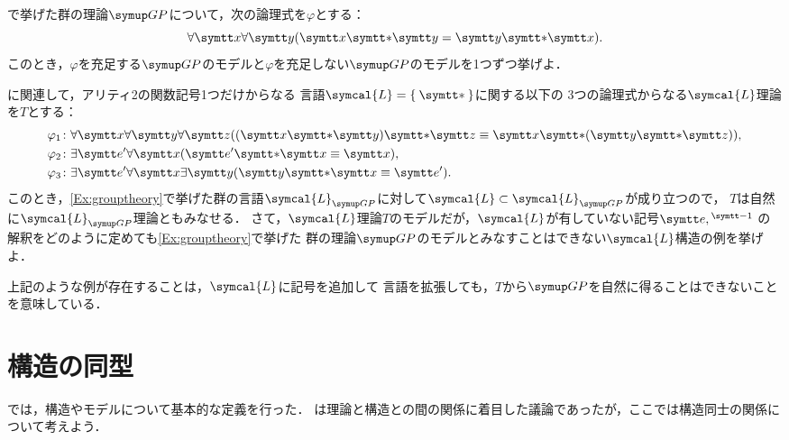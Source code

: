 \begin{Que} \label{Que:model}
	で挙げた群の理論\(\GP\)について，次の論理式を\(\varphi\)とする：
	\[
		\forall \obj{x} \forall \obj{y} \paren{\obj{x} \obj{\ast} \obj{y} = \obj{y} \obj{\ast} \obj{x}}.
	\]
	このとき，\(\varphi\)を充足する\(\GP\)のモデルと\(\varphi\)を充足しない\(\GP\)のモデルを1つずつ挙げよ．
\end{Que}

\begin{Que} \label{Que:grouptheoryaxiomize}
	に関連して，アリティ2の関数記号1つだけからなる
	言語\(\symcal{L} = \Set{\obj{\ast}}\)に関する以下の
	3つの論理式からなる\(\symcal{L}\)理論を\(T\)とする：
	\begin{align*}
		\varphi_1 \colon & \forall \obj{x} \forall \obj{y} \forall \obj{z}
		\paren{\paren{\obj{x} \obj{\ast} \obj{y}} \obj{\ast} \obj{z} \objeq \obj{x} \obj{\ast} \paren{\obj{y} \obj{\ast} \obj{z}}}, \\
		\varphi_2 \colon & \exists \obj{e'} \forall \obj{x} \paren{\obj{e'} \obj{\ast} \obj{x} \objeq \obj{x}},                     \\
		\varphi_3 \colon & \exists \obj{e'}\forall \obj{x} \exists \obj{y} \paren{\obj{y} \obj{\ast} \obj{x} \objeq \obj{e'}}.
	\end{align*}
	このとき，\cref{Ex:grouptheory}で挙げた群の言語\(\symcal{L}_{\GP}\)に対して\(\symcal{L} \subset \symcal{L}_{\GP}\)が成り立つので，
	\(T\)は自然に\(\symcal{L}_{\GP}\)理論ともみなせる．
	さて，\(\symcal{L}\)理論\(T\)のモデルだが，\(\symcal{L}\)が有していない記号\(\obj{e}, {}^{\obj{-1}}\)
	の解釈をどのように定めても\cref{Ex:grouptheory}で挙げた
	群の理論\(\GP\)のモデルとみなすことはできない\(\symcal{L}\)構造の例を挙げよ．

	上記のような例が存在することは，\(\symcal{L}\)に記号を追加して
	言語を拡張しても，\(T\)から\(\GP\)を自然に得ることはできないことを意味している．
\end{Que}



\section{構造の同型} \label{sec:isomorphic}

では，構造やモデルについて基本的な定義を行った．
は理論と構造との間の関係に着目した議論であったが，ここでは構造同士の関係について考えよう．


